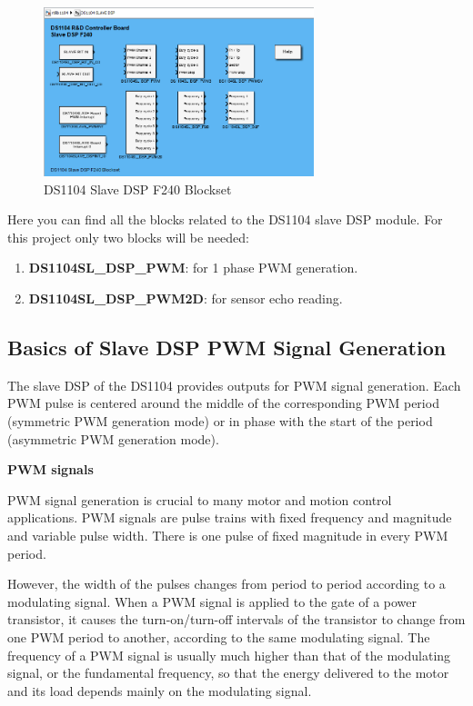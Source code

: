      \begin{figure}[H]
        \centering
        \includegraphics[width=0.7\textwidth]{Images/Ball and Bean/MatLab13.png}
        \caption{DS1104 Slave DSP F240 Blockset}
        \label{fig14}
    \end{figure}
Here you can find all the blocks related to the DS1104 slave DSP module.
For this project only two blocks will be needed:
\begin{enumerate}
    \item \textbf{DS1104SL\_DSP\_PWM}: for 1 phase PWM generation.
    \item \textbf{DS1104SL\_DSP\_PWM2D}: for sensor echo reading.
\end{enumerate}

\subsection{Basics of Slave DSP PWM Signal Generation}
The slave DSP of the DS1104 provides outputs for PWM signal generation. Each PWM pulse is centered around the middle of the corresponding PWM period (symmetric PWM generation mode) or in phase with the start of the period (asymmetric PWM generation mode).

\noindent \textbf{PWM signals}\par

PWM signal generation is crucial to many motor and motion control applications. PWM signals are pulse trains with fixed frequency and magnitude and variable pulse width. There is one pulse of fixed magnitude in every PWM period.

However, the width of the pulses changes from period to period according to a modulating signal. When a PWM signal is applied to the gate of a power transistor, it causes the turn-on/turn-off intervals of the transistor to change from one PWM period to another, according to the same modulating signal. The frequency of a PWM signal is usually much higher than that of the modulating signal, or the fundamental frequency, so that the energy delivered to the motor and its load depends mainly on the modulating signal.

